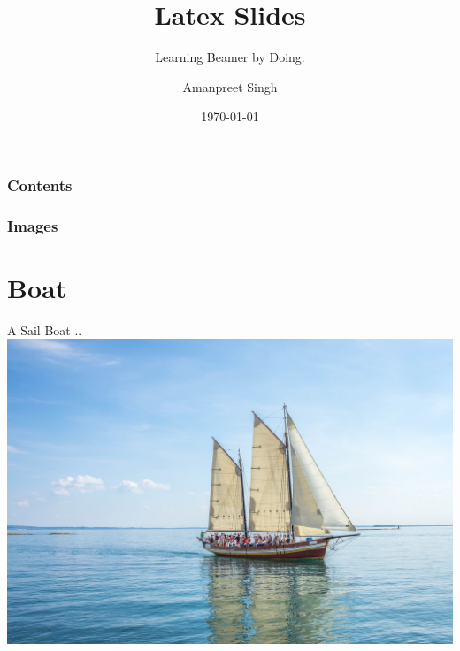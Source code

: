\documentclass{beamer}
\title{Latex Slides}
\subtitle{Learning Beamer by Doing.}
\author{Amanpreet Singh}
\date{\today}
\begin{document}
\maketitle

\begin{frame}
    \frametitle{Contents}
    
    \tableofcontents
\end{frame}

\begin{frame}
    \frametitle{Images}
    \section{Boat}
    A Sail Boat ..
    \includegraphics[width=0.8\linewidth]{boat.jpg}
\end{frame}
\end{document}
